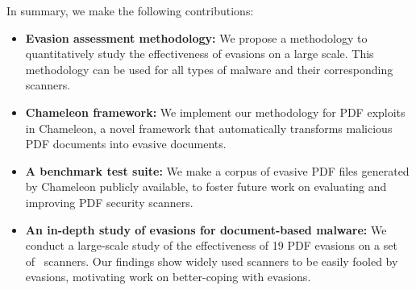 In summary, we make the following contributions:
\begin{itemize}
    \item \textbf{Evasion assessment methodology:} We propose a methodology to quantitatively study the effectiveness of evasions on a large scale. This methodology can be used for all types of malware and their corresponding scanners.
    \item \textbf{Chameleon framework:} We implement our methodology for PDF exploits in Chameleon, a novel framework that automatically transforms malicious PDF documents into evasive documents.
    \item \textbf{A benchmark test suite:} We make a corpus of \nbSamplesSize{} evasive PDF files generated by Chameleon publicly available, to foster future work on evaluating and improving PDF security scanners.
    \item \textbf{An in-depth study of evasions for document-based malware:} We conduct a large-scale study of the effectiveness of 19 PDF evasions on a set of~\nbAnalyzers{} scanners. Our findings show widely used scanners to be easily fooled by evasions, motivating work on better-coping with evasions.
    
\end{itemize}

